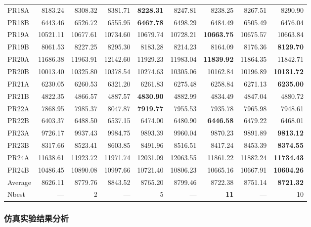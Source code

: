 \documentclass{setp-new}
\begin{document}
\begin{table}[htbp]
\begin{tabular*}{\textwidth}{@{\extracolsep{\fill}}lrrrrrrrr@{}}
    PR18A & 8183.24 & 8308.32 & 8381.71 & \textbf{8228.31} & 8247.81 & 8238.25 & 8267.51 & 8290.90\\
    PR18B & 6443.46 & 6526.72 & 6555.95 & \textbf{6467.78} & 6498.29 & 6484.49 & 6505.49 & 6476.04\\
    PR19A & 10521.11 & 10677.61 & 10734.60 & 10679.74 & 10728.21 & \textbf{10663.75} & 10675.57 & 10663.84\\
    PR19B & 8061.53 & 8227.25 & 8295.30 & 8183.28 & 8214.23 & 8164.09 & 8176.36 & \textbf{8129.70}\\
    PR20A & 11686.38 & 11963.91 & 12142.60 & 11929.23 & 11983.04 & \textbf{11839.92} & 11864.35 & 11842.71\\
    PR20B & 10013.40 & 10325.80 & 10378.54 & 10274.63 & 10305.06 & 10162.84 & 10196.89 & \textbf{10131.72}\\
    PR21A & 6230.05 & 6260.53 & 6321.20 & 6261.83 & 6275.48 & 6258.84 & 6271.13 & \textbf{6235.00}\\
    PR21B & 4822.35 & 4866.57 & 4887.57 & \textbf{4830.90} & 4882.99 & 4834.49 & 4847.04 & 4880.72\\
    PR22A & 7868.95 & 7985.37 & 8047.87 & \textbf{7919.77} & 7955.53 & 7935.78 & 7965.98 & 7948.61\\
    PR22B & 6403.37 & 6488.50 & 6537.15 & 6474.00 & 6480.90 & \textbf{6446.58} & 6479.22 & 6468.01\\
    PR23A & 9726.17 & 9937.43 & 9984.75 & 9893.39 & 9960.04 & 9870.23 & 9891.89 & \textbf{9813.12}\\
    PR23B & 8317.66 & 8523.41 & 8603.85 & 8491.96 & 8516.51 & 8417.24 & 8453.39 & \textbf{8374.55}\\
    PR24A & 11638.61 & 11923.72 & 11971.74 & 12031.09 & 12063.55 & 11861.22 & 11882.24 & \textbf{11734.43}\\
    PR24B & 10486.45 & 10890.08 & 10997.66 & 10721.40 & 10806.23 & 10665.16 & 10667.91 & \textbf{10604.26}\\
    \midrule
    Average & 8626.11 & 8779.76 & 8843.52 & 8765.20 & 8799.46 & 8722.38 & 8751.14 & \textbf{8721.32}\\
    Nbest & --- & 2 & --- & 5 & --- & \textbf{11} & --- & 10\\
    \bottomrule
  \end{tabular*}
\end{table}

\subsubsection{仿真实验结果分析}
\end{document}
